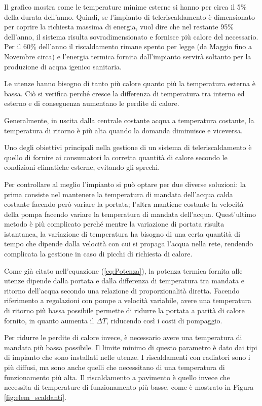 \documentclass[laurea,oneside,11pt]{USiena_tesiLM3}
\begin{document}
 Il grafico mostra come le temperature minime esterne si hanno per circa il 5\% della durata dell'anno. Quindi, se l'impianto di teleriscaldamento è dimensionato per coprire la richiesta massima di energia, vuol dire che nel restante 95\% dell'anno, il sistema risulta sovradimensionato e fornisce più calore del necessario.  Per il 60\% dell'anno il riscaldamento rimane spento per legge (da Maggio fino a Novembre circa) e l'energia termica fornita dall'impianto servirà soltanto per la produzione di acqua igenico sanitaria.

Le utenze hanno bisogno di tanto più calore quanto più la temperatura esterna è bassa. Ciò si verifica perché cresce la differenza di temperatura tra interno ed esterno e di conseguenza aumentano le perdite di calore. 

Generalmente, in uscita dalla centrale costante acqua a temperatura costante, la temperatura di ritorno è più alta quando la domanda diminuisce e viceversa.

Uno degli obiettivi principali nella gestione di un sistema di teleriscaldamento è quello  di fornire ai consumatori la corretta quantità di calore secondo le condizioni climatiche esterne,  evitando gli sprechi.

Per controllare al meglio l'impianto si può optare per due diverse soluzioni: la prima consiste nel mantenere la temperatura di mandata dell'acqua calda costante facendo però variare la portata; l'altra mantiene costante la velocità della pompa facendo variare la temperatura di mandata dell'acqua. Quest'ultimo metodo è più complicato perché mentre la variazione di portata risulta istantanea, la variazione di temperatura ha bisogno di una certa quantità di tempo  che dipende dalla velocità con cui si propaga l'acqua nella rete, rendendo complicata la gestione in caso di picchi di richiesta di calore. 

Come già citato nell'equazione (\ref{eq:Potenza}), la potenza termica fornita alle utenze dipende dalla portata e dalla differenza di temperatura tra mandata e ritorno dell'acqua secondo una relazione di proporzionalità diretta. Facendo riferimento a regolazioni con pompe a velocità variabile, avere una temperatura di ritorno più bassa possibile permette di ridurre la portata a parità di calore fornito, in quanto aumenta il $\Delta T$, riducendo così i costi di pompaggio.

Per ridurre le perdite di calore invece, è necessario avere una temperatura di mandata più bassa possibile. Il limite minimo di questo parametro è dato dai tipi di impianto che sono installati nelle utenze. I riscaldamenti con radiatori sono i più diffusi, ma sono anche quelli che necessitano di una temperatura di funzionamento più alta. Il riscaldamento a pavimento è quello invece che necessita di temperature di funzionamento più basse, come è mostrato in Figura \ref{fig:elem_scaldanti}. 
\end{document}
